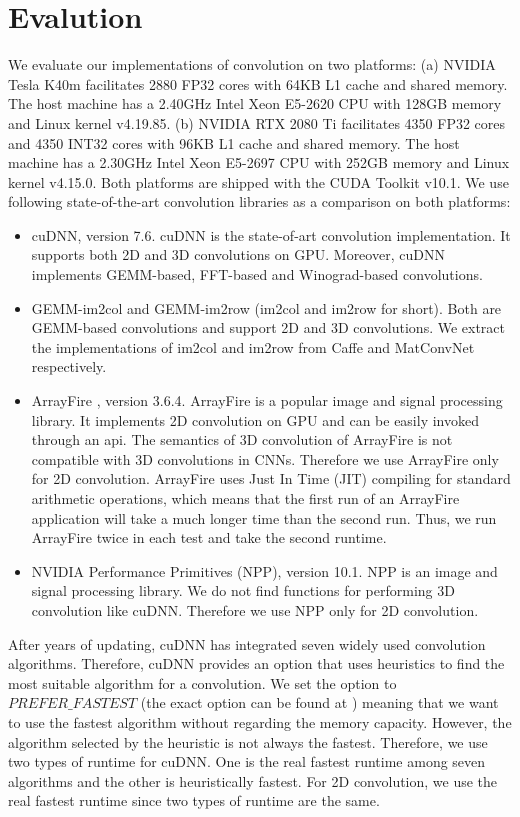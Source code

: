 \section{Evalution}
We evaluate our implementations of convolution on two platforms: (a) NVIDIA Tesla K40m facilitates 2880 FP32 cores with 64KB L1 cache and
shared memory. The host machine has a 2.40GHz Intel Xeon E5-2620 CPU with 128GB memory and Linux kernel v4.19.85. (b) NVIDIA RTX 2080 Ti
facilitates 4350 FP32 cores and 4350 INT32 cores with 96KB L1 cache and shared memory. The host machine has a 2.30GHz Intel Xeon E5-2697
CPU with 252GB memory and Linux kernel v4.15.0. Both platforms are shipped with the CUDA Toolkit v10.1. We use following state-of-the-art
convolution libraries as a comparison on both platforms:
\begin{itemize}
  \item cuDNN, version 7.6. cuDNN is the state-of-art convolution implementation. It supports both 2D and 3D convolutions on GPU.
      Moreover, cuDNN implements GEMM-based, FFT-based and Winograd-based convolutions.
  \item GEMM-im2col and GEMM-im2row (im2col and im2row for short). Both are GEMM-based convolutions and support 2D and 3D convolutions.
      We extract the implementations of im2col and im2row from Caffe \cite{jia2014caffe} and MatConvNet \cite{vedaldi15matconvnet}
      respectively.
  \item ArrayFire \cite{Yalamanchili2015}, version 3.6.4. ArrayFire is a popular image and signal processing library. It implements 2D
      convolution on GPU and can be easily invoked through an api. The semantics of 3D convolution of ArrayFire is not compatible with 3D
      convolutions in CNNs. Therefore we use ArrayFire only for 2D convolution. ArrayFire uses Just In Time (JIT) compiling for standard
      arithmetic operations, which means that the first run of an ArrayFire application will take a much longer time than the second run.
      Thus, we run ArrayFire twice in each test and take the second runtime.
  \item NVIDIA Performance Primitives (NPP), version 10.1. NPP is an image and signal processing library. We do not find functions for
      performing 3D convolution like cuDNN. Therefore we use NPP only for 2D convolution.

\end{itemize}

After years of updating, cuDNN has integrated seven widely used convolution algorithms. Therefore, cuDNN provides an option that uses
heuristics to find the most suitable algorithm for a convolution. We set the option to $PREFER\_FASTEST$ (the exact option can be found at
\cite{CUDAtoolkit}) meaning that we want to use the fastest algorithm without regarding the memory capacity. However, the algorithm
selected by the heuristic is not always the fastest. Therefore, we use two types of runtime for cuDNN. One is the real fastest runtime
among seven algorithms and the other is heuristically fastest. For 2D convolution, we use the real fastest runtime since two types of
runtime are the same.


